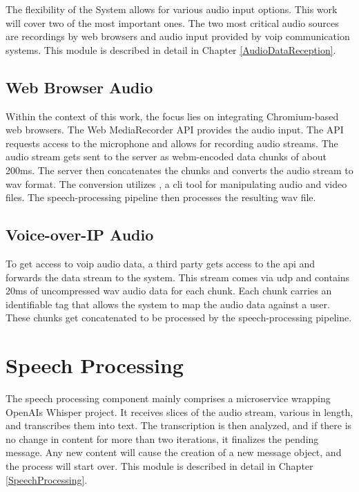 The flexibility of the System allows for various audio input options. This work will cover two of the most important 
ones. The two most critical audio sources are recordings by web browsers and audio input provided by \ac{voip} 
communication systems. This module is described in detail in Chapter \ref{AudioDataReception}.

\subsection{Web Browser Audio}

Within the context of this work, the focus lies on integrating Chromium-based web browsers. The Web MediaRecorder API 
provides the audio input. The API requests access to the microphone and allows for recording audio streams. 
The audio stream gets sent to the server as \ac{webm}-encoded data chunks of about 200ms. The server then concatenates 
the chunks and converts the audio stream to \ac{wav} format. The conversion utilizes \cite{ffmpeg2023}, a \ac{cli} tool 
for manipulating audio and video files. The speech-processing pipeline then processes the resulting \ac{wav} file.

\subsection{Voice-over-IP Audio}

To get access to \ac{voip} audio data, a third party gets access to the \ac{api} and forwards the data stream to the 
system. This stream comes via \ac{udp} and contains 20ms of uncompressed \ac{wav} audio data for each chunk.
Each chunk carries an identifiable tag that allows the system to map the audio data against a user.
These chunks get concatenated to be processed by the speech-processing pipeline.


\section{Speech Processing}

The speech processing component mainly comprises a microservice wrapping OpenAIs Whisper project. It receives slices of 
the audio stream, various in length, and transcribes them into text. The transcription is then analyzed, and if there 
is no change in content for more than two iterations, it finalizes the pending message. Any new content will cause the 
creation of a new message object, and the process will start over. This module is described in detail in Chapter 
\ref{SpeechProcessing}.

